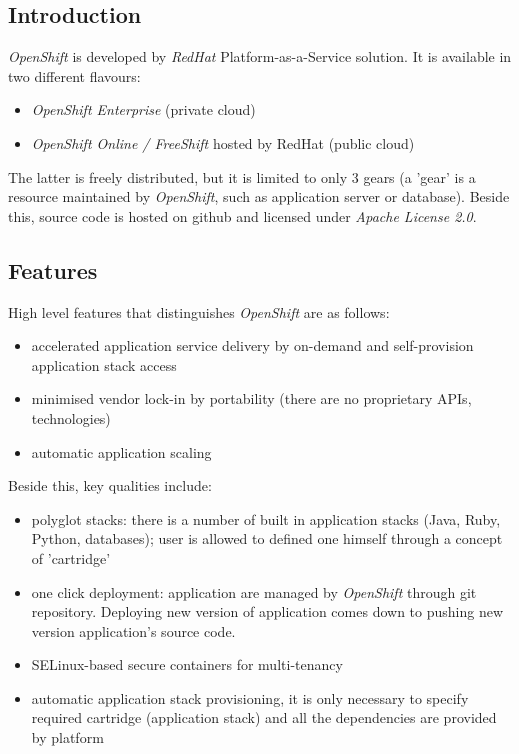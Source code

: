 \subsection{Introduction}
\emph{OpenShift} is developed by \emph{RedHat} Platform-as-a-Service solution. It is available in two different flavours:
\begin{itemize}
 \item \emph{OpenShift Enterprise} (private cloud)
 \item \emph{OpenShift Online / FreeShift} hosted by RedHat (public cloud)
\end{itemize}

The latter is freely distributed, but it is limited to only 3 gears (a 'gear' is a resource maintained by \emph{OpenShift}, such as application server or database). Beside this, source code is hosted on github and licensed under \emph{Apache License 2.0}.

\subsection{Features}
High level features that distinguishes \emph{OpenShift} are as follows:
\begin{itemize}
  \item accelerated application service delivery by on-demand and self-provision application stack access
  \item minimised vendor lock-in by portability (there are no proprietary APIs, technologies)
  \item automatic application scaling
\end{itemize}

Beside this, key qualities include:
\begin{itemize}
  \item polyglot stacks: there is a number of built in application stacks (Java, Ruby, Python, databases); user is allowed to defined one himself through a concept of 'cartridge'
  \item one click deployment: application are managed by \emph{OpenShift} through git repository. Deploying new version of application comes down to pushing new version application's source code.
  \item SELinux-based secure containers for multi-tenancy
  \item automatic application stack provisioning, it is only necessary to specify required cartridge (application stack) and all the dependencies are provided by platform
\end{itemize}


